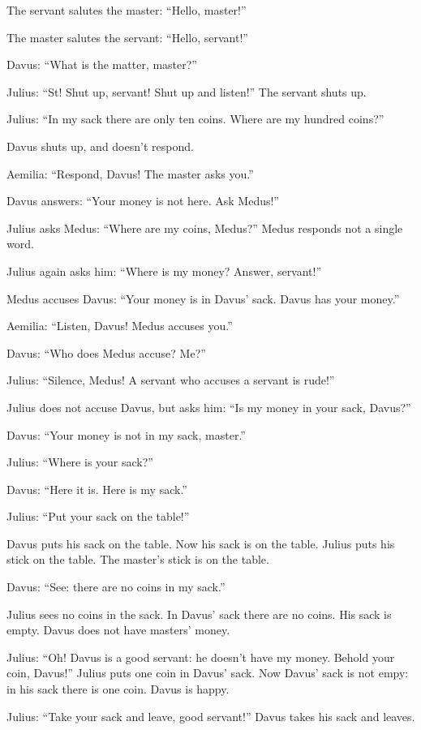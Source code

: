 The servant salutes the master: ``Hello, master!''

The master salutes the servant: ``Hello, servant!''

Davus: ``What is the matter, master?''

Julius: ``St! Shut up, servant! Shut up and listen!'' The servant shuts up.

Julius: ``In my sack there are only ten coins. Where are my hundred coins?''

Davus shuts up, and doesn't respond.

Aemilia: ``Respond, Davus! The master asks you.''

Davus answers: ``Your money is not here. Ask Medus!''

Julius asks Medus: ``Where are my coins, Medus?'' Medus responds not a single word.

Julius again asks him: ``Where is my money? Answer, servant!''

Medus accuses Davus: ``Your money is in Davus' sack. Davus has your money.''

Aemilia: ``Listen, Davus! Medus accuses you.''

Davus: ``Who does Medus accuse? Me?''

Julius: ``Silence, Medus! A servant who accuses a servant is rude!''

Julius does not accuse Davus, but asks him: ``Is my money in your sack, Davus?''

Davus: ``Your money is not in my sack, master.''

Julius: ``Where is your sack?''

Davus: ``Here it is. Here is my sack.''

Julius: ``Put your sack on the table!''

Davus puts his sack on the table. Now his sack is on the table. Julius puts his stick on the table. The master's stick is on the table.

Davus: ``See: there are no coins in my sack.''

Julius sees no coins in the sack. In Davus' sack there are no coins. His sack is empty. Davus does not have masters' money.

Julius: ``Oh! Davus is a good servant: he doesn't have my money. Behold your coin, Davus!'' Julius puts one coin in Davus' sack. Now Davus' sack is not empy: in his sack there is one coin. Davus is happy.

Julius: ``Take your sack and leave, good servant!'' Davus takes his sack and leaves.

